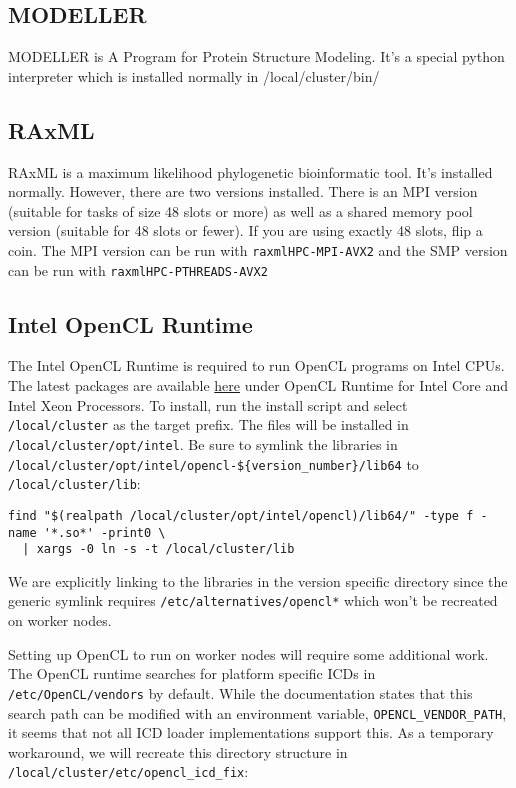 \documentclass[]{book}
\begin{document}
\subsection{MODELLER}\label{modeller}

MODELLER is A Program for Protein Structure Modeling. It's a special
python interpreter which is installed normally in /local/cluster/bin/

\subsection{RAxML}\label{raxml}

RAxML is a maximum likelihood phylogenetic bioinformatic tool. It's
installed normally. However, there are two versions installed. There is
an MPI version (suitable for tasks of size 48 slots or more) as well as
a shared memory pool version (suitable for 48 slots or fewer). If you
are using exactly 48 slots, flip a coin. The MPI version can be run with
\texttt{raxmlHPC-MPI-AVX2} and the SMP version can be run with
\texttt{raxmlHPC-PTHREADS-AVX2}

\subsection{Intel OpenCL Runtime}\label{intel-opencl-runtime}

The Intel OpenCL Runtime is required to run OpenCL programs on Intel
CPUs. The latest packages are available
\href{https://software.intel.com/en-us/articles/opencl-drivers}{here}
under OpenCL Runtime for Intel Core and Intel Xeon Processors. To
install, run the install script and select \texttt{/local/cluster} as
the target prefix. The files will be installed in
\texttt{/local/cluster/opt/intel}. Be sure to symlink the libraries in
\texttt{/local/cluster/opt/intel/opencl-\$\{version\_number\}/lib64} to
\texttt{/local/cluster/lib}:

\begin{verbatim}
find "$(realpath /local/cluster/opt/intel/opencl)/lib64/" -type f -name '*.so*' -print0 \
  | xargs -0 ln -s -t /local/cluster/lib
\end{verbatim}

We are explicitly linking to the libraries in the version specific
directory since the generic symlink requires
\texttt{/etc/alternatives/opencl*} which won't be recreated on worker
nodes.

Setting up OpenCL to run on worker nodes will require some additional
work. The OpenCL runtime searches for platform specific ICDs in
\texttt{/etc/OpenCL/vendors} by default. While the documentation states
that this search path can be modified with an environment variable,
\texttt{OPENCL\_VENDOR\_PATH}, it seems that not all ICD loader
implementations support this. As a temporary workaround, we will
recreate this directory structure in
\texttt{/local/cluster/etc/opencl\_icd\_fix}:
\end{document}
